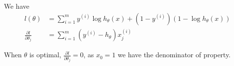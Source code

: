 \begin{answer}
	
	We have
	\begin{align}
	l(\theta) &= \sum_{i=1}^{m} y^{(i)}\log h_{\theta} (x) + (1-y^{(i)})(1-\log h_{\theta}(x)) \\
	\frac{\partial l}{\partial \theta_{j}} &= \sum_{i=1}^{m} \left( y^{(i)} - h_{\theta} \right)x^{(i)}_{j}
	\end{align}
	
	When $\theta$ is optimal, $\frac{\partial l}{\partial \theta_{j}} = 0$, as $x_{0} = 1$ we have the denominator of property.
\end{answer}
